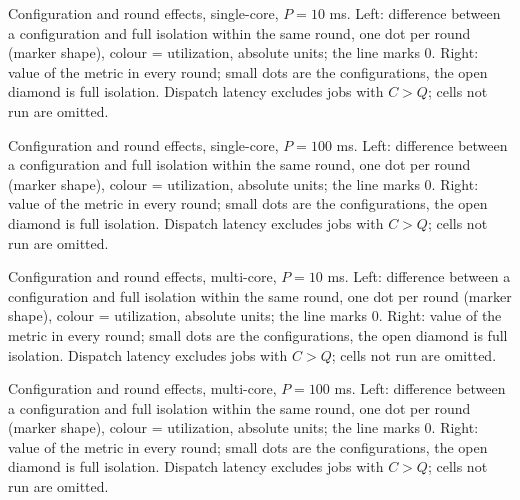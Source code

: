 \caption{Configuration and round effects, single-core, $P = 10$ ms. Left: difference between a configuration and full isolation within the same round, one dot per round (marker shape), colour = utilization, absolute units; the line marks 0. Right: value of the metric in every round; small dots are the configurations, the open diamond is full isolation. Dispatch latency excludes jobs with $C > Q$; cells not run are omitted.}

\caption{Configuration and round effects, single-core, $P = 100$ ms. Left: difference between a configuration and full isolation within the same round, one dot per round (marker shape), colour = utilization, absolute units; the line marks 0. Right: value of the metric in every round; small dots are the configurations, the open diamond is full isolation. Dispatch latency excludes jobs with $C > Q$; cells not run are omitted.}

\caption{Configuration and round effects, multi-core, $P = 10$ ms. Left: difference between a configuration and full isolation within the same round, one dot per round (marker shape), colour = utilization, absolute units; the line marks 0. Right: value of the metric in every round; small dots are the configurations, the open diamond is full isolation. Dispatch latency excludes jobs with $C > Q$; cells not run are omitted.}

\caption{Configuration and round effects, multi-core, $P = 100$ ms. Left: difference between a configuration and full isolation within the same round, one dot per round (marker shape), colour = utilization, absolute units; the line marks 0. Right: value of the metric in every round; small dots are the configurations, the open diamond is full isolation. Dispatch latency excludes jobs with $C > Q$; cells not run are omitted.}
